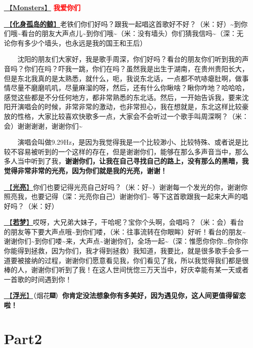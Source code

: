 \documentclass[]{ctexbook}
\begin{document}
\hyperref[Monsters]{🎵【\textbf{Monsters}】} \textbf{\textcolor{red}{我爱你们~} }

\hyperref[hua-shen-gu-dao-de-jing]{🎵【\textbf{化身孤岛的鲸}】}老铁们你们好吗？跟我一起唱这首歌好不好？（米：好）\textasciitilde 到你们哦\textasciitilde 看台的朋友大声点儿\textasciitilde 到你们哦\textasciitilde（米：没有墙头）你们猜我信吗\textasciitilde（深：无论你有多少个墙头，也永远是我的国王和王后）

  沈阳的朋友们大家好，我是歌手周深，你们好吗？看台的朋友你们听到我的声音吗？你们在吗？吓我一跳，你们在吗？虽然我是出生于湖南，在贵州贵阳长大，但是东北我真的是太熟悉，就什么，呃，我说东北话，一点都不吭哧瘪肚啊，做事情尽量不磨磨叽叽，尽量麻溜的呀，然后，还有什么你瞅啥？瞅你咋地？哈哈哈，感觉这些都是不分任何地方，都非常熟悉的东北话。然后，一开始告诉我，要来沈阳开演唱会的时候，非常非常的激动，也非常担心，我在想就是，东北这样比较豪放的性格，大家比较喜欢快歌多一点，大家会不会听过一个歌手叫周深啊？（米：会）谢谢谢谢，谢谢你们\textasciitilde{}

  演唱会叫做9.29Hz，是因为我觉得我是一个比较渺小、比较特殊、或者说是比较不容易被听到的一个这样的存在，但是谢谢你们，能够在那么多声音当中，那么多人当中听到了我，\textbf{谢谢你们，让我在自己寻找自己的路上，没有那么的黑暗，我觉得非常非常的光亮，因为你们就是我的光亮，谢谢！}

\hyperref[silver-linings]{🎵【\textbf{光亮}】}你们也要记得光亮自己好吗？（米：好\textasciitilde）谢谢每一个发光的你，谢谢你照亮我，也要记得（深：光亮你自己）谢谢你们\textasciitilde{}
等下这首歌跟我一起来大声的唱好吗？（米：好）

\hyperref[ruomeng]{🎵【\textbf{若梦}】}哎呀，大兄弟大妹子，干哈呢？宝你个头啊，会唱吗？（米：会）看台的朋友等下要大声点哦\textasciitilde 到你们喽，（米：往事流转在你眼眸）好听！看台的朋友\textasciitilde 谢谢你们\textasciitilde 到你们喽\textasciitilde 来，大声点\textasciitilde 谢谢你们，全场一起\textasciitilde（深：惟愿你你你\ldots 你你你你能得到拯救，因为你们，我才得到拯救）我知道，我要比，就是很多歌手会多一道要被接纳的过程，谢谢你们愿意看见我，你们看见了我，所以我觉得我们都是很棒的人，谢谢你们听到了我！在这人世间恍惚三万天当中，好庆幸能有某一天或者一首歌的时间遇到你！

\hyperref[floating-light]{🎵【\textbf{浮光}】}（烟花🎆）\textbf{你肯定没法想象你有多美好，因为遇见你，这人间更值得留恋啦！}

\section{Part2}\label{shenyang-20240907-part2}
\end{document}
